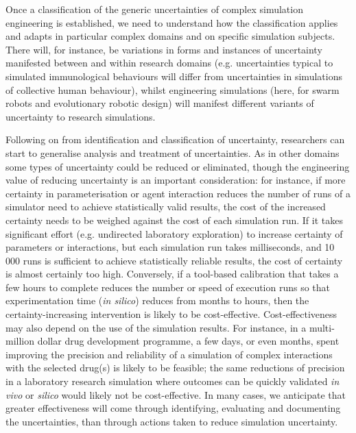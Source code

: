 \documentclass[sigconf,authordraft]{acmart}
\begin{document}
Once a classification of the generic uncertainties of complex simulation engineering is established, we need to understand how the classification applies and adapts in particular complex domains and on specific simulation subjects.  There will, for instance, be variations in forms and instances of uncertainty  manifested between and within research domains (e.g. uncertainties typical to simulated immunological behaviours will differ from uncertainties in simulations of collective human behaviour), whilst engineering simulations (here, for swarm robots and evolutionary robotic design) will manifest different variants of uncertainty to research simulations.

Following on from identification and classification of uncertainty, researchers can start to generalise analysis and treatment of uncertainties.  As in other domains some types of uncertainty could be reduced or eliminated, though the engineering value of reducing uncertainty is an important consideration: for instance, if more certainty in parameterisation or agent interaction reduces the number of runs of a simulator need to achieve statistically valid results, the cost of the increased certainty needs to be weighed against the cost of each simulation run.  If it takes significant effort (e.g. undirected laboratory exploration) to increase certainty of parameters or interactions, but each simulation run takes milliseconds, and 10 000 runs is sufficient to achieve statistically reliable results, the cost of certainty is almost certainly too high.  Conversely, if a tool-based calibration that takes a few hours to complete reduces the number or speed of execution runs so that  experimentation time (\emph{in silico}) reduces from months to hours, then the certainty-increasing intervention is likely to be cost-effective.  Cost-effectiveness may also depend on the use of the simulation results.  For instance, in a multi-million dollar drug development programme, a few days, or even months, spent improving the precision and reliability of a simulation of complex interactions with the selected drug(s) is likely to be feasible; the same reductions of precision in a laboratory research simulation where outcomes can be quickly validated \emph{in vivo} or \emph{silico} would likely not be cost-effective.  In many cases, we anticipate that greater effectiveness will come through  identifying, evaluating and documenting the uncertainties, than through actions taken to reduce simulation uncertainty.  
\end{document}
